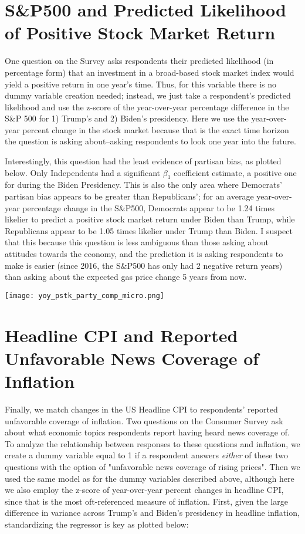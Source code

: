 \documentclass{article}
\begin{document}
\raggedright \section{S\&P500 and Predicted Likelihood of Positive Stock Market Return}

One question on the Survey asks respondents their predicted likelihood (in percentage form) that an investment in a broad-based stock market index would yield a positive return in one year's time. Thus, for this variable there is no dummy variable creation needed; instead, we just take a respondent's predicted likelihood and use the z-score of the year-over-year percentage difference in the S\&P 500 for 1) Trump's and 2) Biden's presidency. Here we use the year-over-year percent change in the stock market because that is the exact time horizon the question is asking about--asking respondents to look one year into the future.

Interestingly, this question had the least evidence of partisan bias, as plotted below. Only Independents had a significant $\beta_1$ coefficient estimate, a positive one for during the Biden Presidency. This is also the only area where Democrats' partisan bias appears to be greater than Republicans'; for an average year-over-year percentage change in the S\&P500, Democrats appear to be 1.24 times likelier to predict a positive stock market return under Biden than Trump, while Republicans appear to be 1.05 times likelier under Trump than Biden. I suspect that this because this question is less ambiguous than those asking about attitudes towards the economy, and the prediction it is asking respondents to make is easier (since 2016, the S\&P500 has only had 2 negative return years) than asking about the expected gas price change 5 years from now. 

\centering \texttt{[image: yoy\_pstk\_party\_comp\_micro.png]}

\raggedright \section{Headline CPI and Reported Unfavorable News Coverage of Inflation} 

Finally, we match changes in the US Headline CPI to respondents' reported unfavorable coverage of inflation. Two questions on the Consumer Survey ask about what economic topics respondents report having heard news coverage of. To analyze the relationship between responses to these questions and inflation, we create a dummy variable equal to 1 if a respondent answers \textit{either} of these two questions with the option of "unfavorable news coverage of rising prices". Then we used the same model as for the dummy variables described above, although here we also employ the z-score of year-over-year percent changes in headline CPI, since that is the most oft-referenced measure of inflation. First, given the large difference in variance across Trump's and Biden's presidency in headline inflation, standardizing the regressor is key as plotted below:
\end{document}
